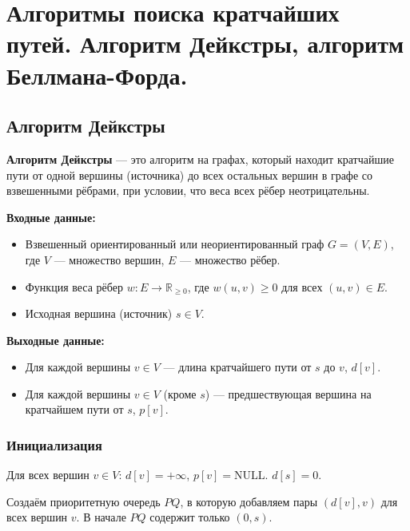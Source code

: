 \section{Алгоритмы поиска кратчайших путей. Алгоритм Дейкстры, алгоритм Беллмана-Форда. }

	
\subsection{Алгоритм Дейкстры}

\begin{definition}
	\textbf{Алгоритм Дейкстры} --- это алгоритм на графах, который находит кратчайшие пути от одной вершины (источника) до всех остальных вершин в графе со взвешенными рёбрами, при условии, что веса всех рёбер неотрицательны.
\end{definition}

\noindent \textbf{Входные данные:}
\begin{itemize}
	\item Взвешенный ориентированный или неориентированный граф $G=(V, E)$, где $V$ --- множество вершин, $E$ --- множество рёбер.
	\item Функция веса рёбер $w: E \to \mathbb{R}_{\ge 0}$, где $w(u,v) \ge 0$ для всех $(u,v) \in E$.
	\item Исходная вершина (источник) $s \in V$.
\end{itemize}

\noindent \textbf{Выходные данные:}
\begin{itemize}
	\item Для каждой вершины $v \in V$ --- длина кратчайшего пути от $s$ до $v$, $d[v]$.
	\item Для каждой вершины $v \in V$ (кроме $s$) --- предшествующая вершина на кратчайшем пути от $s$, $p[v]$.
\end{itemize}

\subsubsection{Инициализация}
Для всех вершин $v \in V$:
$d[v] = +\infty$, $p[v] = \text{NULL}$.
$d[s] = 0$.

Создаём приоритетную очередь $PQ$, в которую добавляем пары $(d[v], v)$ для всех вершин $v$.
В начале $PQ$ содержит только $(0, s)$.

